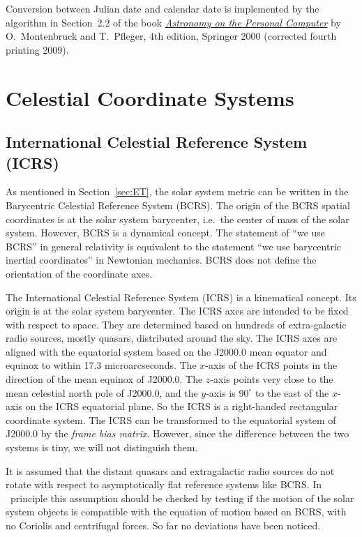 \documentclass[12pt]{article}
\begin{document}
Conversion between Julian date and calendar date is implemented by the algorithm 
in Section~2.2 of the book \href{https://www.springer.com/us/book/9783540672210#}
{\it Astronomy on the Personal Computer} by 
O.~Montenbruck and T.~Pfleger, 4th edition, Springer 2000 (corrected fourth 
printing 2009).

\section{Celestial Coordinate Systems}
\label{sec:coordSys}

\subsection{International Celestial Reference System (ICRS)} 

As mentioned in Section~\ref{sec:ET}, the solar system metric can be 
written in the Barycentric Celestial Reference System (BCRS). The origin of the 
BCRS spatial coordinates is at the solar system barycenter, i.e.\ the center 
of mass of the solar system. However, BCRS is a dynamical concept. The 
statement of ``we use BCRS'' in general relativity is equivalent to the 
statement ``we use barycentric inertial coordinates'' in Newtonian 
mechanics. BCRS does not define the orientation of the coordinate axes. 

The International Celestial Reference System (ICRS) is a kinematical concept. Its 
origin is at the solar system barycenter. The ICRS axes are intended to be 
fixed with respect to space. They are 
determined based on hundreds of extra-galactic radio sources, mostly quasars, distributed 
around the sky. The ICRS axes are aligned with the equatorial system based on 
the J2000.0 mean equator and equinox to within 17.3 microarcseconds. The $x$-axis 
of the ICRS points in the direction of the mean equinox of J2000.0. The $z$-axis 
points very close to the mean celestial north pole of J2000.0, and the $y$-axis 
is $90^\circ$ to the east of the $x$-axis on the ICRS equatorial plane. So the ICRS 
is a right-handed rectangular coordinate system. The ICRS can be transformed to the 
equatorial system of J2000.0 by the {\em frame bias matrix}. However, since the 
difference between the two systems is tiny, we will not distinguish them.

It is assumed that the distant quasars and extragalactic radio sources do not 
rotate with respect to asymptotically flat reference systems like BCRS. In \
principle this assumption should be checked by testing if the motion of 
the solar system objects is compatible with the equation of motion based 
on BCRS, with no Coriolis and centrifugal forces. So far no deviations have been 
noticed. 
\end{document}
